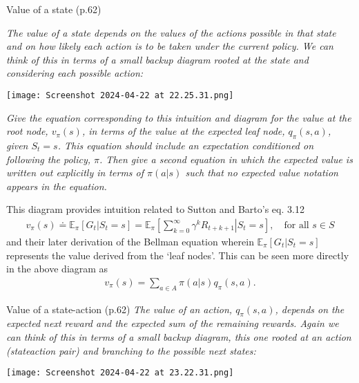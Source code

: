 \documentclass[12pt,letterpaper]{exam}
\begin{document}
\begin{questions}
	\setcounter{question}{18-1}%
	\question%
	Value of a state (p.62)

	\emph{The value of a state depends on the values of the actions possible in that 
	state and on how likely each action is to be taken under the current policy. 
	We can think of this in terms of a small backup diagram rooted at the state and considering each possible action:}

	\texttt{[image: Screenshot 2024-04-22 at 22.25.31.png]}%

	\emph{Give the equation corresponding to this intuition and diagram for the value at the root node, \(v_\pi(s)\), 
	in terms of the value at the expected leaf node, \(q_\pi(s, a)\), given \(S_t = s\).
	This equation should include an expectation conditioned on following the policy, \(\pi\). 
	Then give a second equation in which the expected value is written out explicitly in terms of \(\pi(a|s)\) 
	such that no expected value notation appears in the equation.}
	\begin{solution}
		This diagram provides intuition related to Sutton and Barto's eq. 3.12
		\begin{align*}
			v_\pi(s)\doteq \mathbb E_\pi\left[ G_t|S_t=s \right] 
			= \mathbb E_\pi\left[\left. \sum_{k=0}^\infty\gamma^k R_{t+k+1}\right|S_t=s\right], \quad\text{for all }s\in S
		\end{align*}
		and their later derivation of the Bellman equation wherein \(\mathbb E_\pi\left[ G_t|S_t=s \right]\)
		represents the value derived from the `leaf nodes'.
		This can be seen more directly in the above diagram as
		\begin{align*}
			v_\pi(s) = \sum_{a\in A}\pi(a|s)q_\pi(s,a).
		\end{align*}
	\end{solution}

	\question%
	Value of a state-action (p.62)
	\emph{The value of an action, \(q_\pi(s, a)\), depends on the expected next reward and the expected sum of the remaining rewards. 
	Again we can think of this in terms of a small backup diagram, this one rooted at an action (state\-action pair) 
	and branching to the possible next states:}
	
	\texttt{[image: Screenshot 2024-04-22 at 23.22.31.png]}%


\end{questions}
\end{document}
